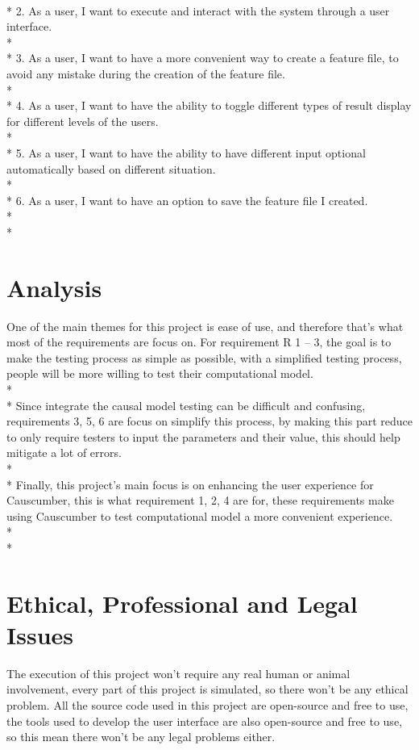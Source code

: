 \\*
2. As a user, I want to execute and interact with the system through a user interface.\\*
\\*
3. As a user, I want to have a more convenient way to create a feature file, to avoid any mistake during the creation of the feature file.\\*
\\*
4. As a user, I want to have the ability to toggle different types of result display for different levels of the users. \\*
\\*
5. As a user, I want to have the ability to have different input optional automatically based on different situation. \\*
\\*
6. As a user, I want to have an option to save the feature file I created. \\*
\\*

\section{Analysis}
One of the main themes for this project is ease of use, and therefore that’s what most of the requirements are focus on. For requirement R 1 – 3, the goal is to make the testing process as simple as possible, with a simplified testing process, people will be more willing to test their computational model. \\*\\*
Since integrate the causal model testing can be difficult and confusing, requirements 3, 5, 6 are focus on simplify this process, by making this part reduce to only require testers to input the parameters and their value, this should help mitigate a lot of errors. \\*\\*
Finally, this project’s main focus is on enhancing the user experience for Causcumber, this is what requirement 1, 2, 4 are for, these requirements make using Causcumber to test computational model a more convenient experience. \\*\\*

\section{Ethical, Professional and Legal Issues}

The execution of this project won’t require any real human or animal involvement, every part of this project is simulated, so there won’t be any ethical problem. All the source code used in this project are open-source and free to use, the tools used to develop the user interface are also open-source and free to use, so this mean there won’t be any legal problems either. 
